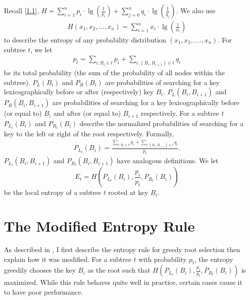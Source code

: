 \documentclass[letterpaper,12pt,titlepage,oneside,final]{book}
\theoremstyle{plain}
\begin{document}
Recall \ref{1.1}, $H = \sum_{i=1}^{n} p_i\cdot\lg(\frac{1}{p_i}) + \sum_{j=0}^{n} q_i\cdot\lg(\frac{1}{q_j})$. We also use
\begin{align*}
H(x_1,x_2,...,x_n) = \sum_{i=1}^{n} x_i\cdot\lg(\frac{1}{x_i})
\end{align*} to describe the entropy of any probability distribution $(x_1, x_2, ...., x_n)$. For subtree $t$, we let 
\begin{align*}
p_t=\sum_{i : B_i \in t} p_i + \sum_{i : (B_i, B_{i+1}) \in t} q_i
\end{align*}
 be its total probability (the sum of the probability of all nodes within the subtree). $P_{L}(B_i)$ and $P_{R}(B_i)$ are probabilities of searching for a key lexicographically before or after (respectively) key $B_i$. $P_{L}(B_i, B_{i+1})$ and $P_{R}(B_i, B_{i+1})$ are probabilities of searching for a key lexicographically before (or equal to) $B_i$ and after (or equal to) $B_{i+1}$ respectively. For a subtree  $t$ $P_{L_t}(B_i)$ and $P_{R_t}(B_i)$ describe the normalized probabilities of searching for a key to the left or right of the root respectively. Formally,
\begin{align*}
P_{L_t}(B_i) = \frac{\sum_{i : B_i \in t} p_i + \sum_{i : (B_i, B_{i+1}) \in t} q_i}{p_t}.
\end{align*}
$P_{L_t}(B_i,B_{i+1})$ and $P_{R_t}(B_i,B_{i+1})$ have analogous definitions. 
We let  
\begin{equation}
E_t=H(P_{L_t}(B_i), \frac{p_i}{p_t}, P_{R_t}(B_i))
\end{equation} be the local entropy of a subtree $t$ rooted at key $B_i$.  

\section{The Modified Entropy Rule}\label{The Modified Entropy Rule}

As described in \cite{guttler1980binary}, I first describe the entropy rule for greedy root selection then explain how it was modified. For a subtree $t$ with probability $p_t$, the entropy greedily chooses the key $B_i$ as the root such that $H(P_{L_t}(B_i), \frac{p_i}{p_t}, P_{R_t}(B_i))$ is maximized. While this rule behaves quite well in practice, certain cases cause it to have poor performance. 
\end{document}
